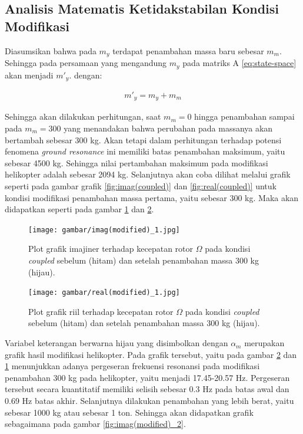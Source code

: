 \subsection{Analisis Matematis Ketidakstabilan Kondisi Modifikasi}

Diasumsikan bahwa pada $m_y$ terdapat penambahan massa baru sebesar $m_m$. Sehingga pada persamaan yang mengandung $m_y$ pada matriks A \ref{eq:state-space} akan menjadi $m'_y$. dengan:

\begin{align}
	\label{eq:modified}
	m'_y=m_y+m_m
\end{align}

Sehingga akan dilakukan perhitungan, saat $m_m = 0$ hingga penambahan sampai pada $m_m = 300$ yang menandakan bahwa perubahan pada massanya akan bertambah sebesar 300 kg. Akan tetapi dalam perhitungan terhadap potensi fenomena \textit{ground resonance} ini memiliki batas penambahan maksimum, yaitu sebesar 4500 kg. Sehingga nilai pertambahan maksimum pada modifikasi helikopter adalah sebesar 2094 kg. Selanjutnya akan coba dilihat melalui grafik seperti pada gambar grafik \ref{fig:imag(coupled)} dan \ref{fig:real(coupled)} untuk kondisi modifikasi penambahan massa pertama, yaitu sebesar 300 kg. Maka akan didapatkan seperti pada gambar \ref{fig:imag(modified)_1} dan \ref{fig:real(modified)_1}.

\begin{figure}[H]
	\centering
	\texttt{[image: gambar/imag(modified)\_1.jpg]}
	\caption{Plot grafik imajiner terhadap kecepatan rotor $\Omega$ pada kondisi \textit{coupled} sebelum (hitam) dan setelah penambahan massa 300 kg (hijau).}
	\label{fig:imag(modified)_1}
\end{figure}

\begin{figure}[H]
	\centering
	\texttt{[image: gambar/real(modified)\_1.jpg]}
	\caption{Plot grafik riil terhadap kecepatan rotor $\Omega$ pada kondisi \textit{coupled} sebelum (hitam) dan setelah penambahan massa 300 kg (hijau).}
	\label{fig:real(modified)_1}
\end{figure}

Variabel keterangan berwarna hijau yang disimbolkan dengan $\alpha_m$ merupakan grafik hasil modifikasi helikopter.  Pada grafik tersebut, yaitu pada gambar \ref{fig:real(modified)_1} dan \ref{fig:imag(modified)_1} menunjukkan adanya pergeseran frekuensi resonansi pada modifikasi penambahan 300 kg pada helikopter, yaitu menjadi 17.45-20.57 Hz. Pergeseran tersebut secara kuantitatif memiliki selisih sebesar 0.3 Hz pada batas awal dan 0.69 Hz batas akhir. Selanjutnya dilakukan penambahan yang lebih berat, yaitu sebesar 1000 kg atau sebesar 1 ton. Sehingga akan didapatkan grafik sebagaimana pada gambar \ref{fig:imag(modified)_2}.

